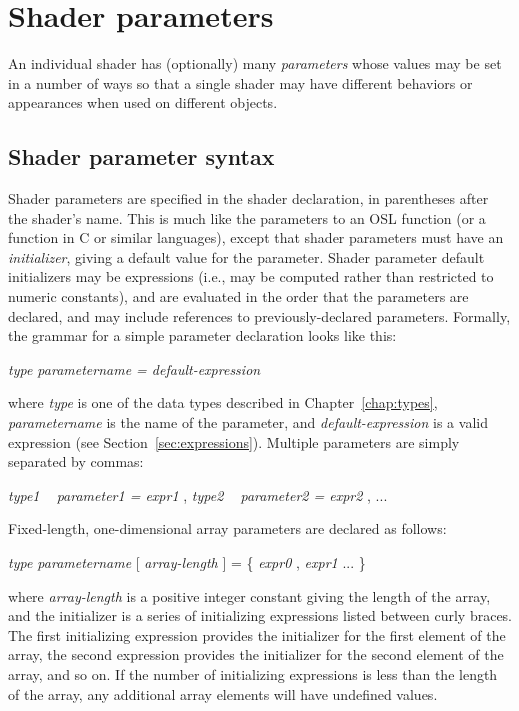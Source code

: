\documentclass[11pt,letterpaper]{book}
\begin{document}
\section{Shader parameters}
\label{sec:shaderparams}
 

An individual shader has (optionally) many \emph{parameters} whose
values may be set in a number of ways so that a single shader may have
different behaviors or appearances when used on different objects.

\subsection{Shader parameter syntax}

Shader parameters are specified in the shader declaration, in
parentheses after the shader's name.  This is much like the parameters
to an OSL function (or a function in C or similar languages),
except that shader parameters must have an \emph{initializer}, giving a
default value for the parameter.  Shader parameter default initializers
may be expressions (i.e., may be computed rather than restricted to
numeric constants), and are evaluated in the order that the parameters
are declared, and may include references to previously-declared
parameters.  Formally, the grammar for a simple parameter
declaration looks like this:

\medskip
\spc \emph{type parametername = default-expression} 
\medskip

\noindent where \emph{type} is one of the data types described
in Chapter~\ref{chap:types}, \emph{parametername} is the name of the
parameter, and \emph{default-expression} is a valid expression
(see Section~\ref{sec:expressions}).  Multiple parameters are 
simply separated by commas:

\medskip
\spc \emph{type1 ~ parameter1 = expr1} {\cf ,} \emph{type2 ~ parameter2 = expr2} {\cf ,} ...
\medskip


Fixed-length, one-dimensional array parameters are declared as follows:

\medskip
\spc \emph{type parametername} {\cf [ } \emph{array-length} {\cf ] = \{ } \emph{expr0}
  {\cf ,} \emph{expr1} ... {\cf \} }
\medskip

\noindent where \emph{array-length} is a positive integer constant
giving the length of the array, and the initializer is a series of
initializing expressions listed between curly braces.  The first
initializing expression provides the initializer for the first element
of the array, the second expression provides the initializer for the
second element of the array, and so on.  If the number of initializing
expressions is less than the length of the array, any additional array
elements will have undefined values.
\end{document}
